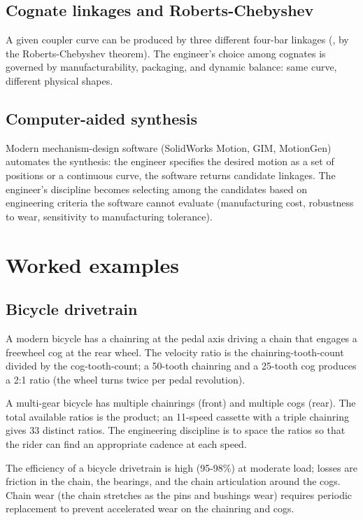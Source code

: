\subsection{Cognate linkages and Roberts-Chebyshev}

A given coupler curve can be produced by three different four-bar linkages (, by the Roberts-Chebyshev theorem). The engineer's choice among cognates is governed by manufacturability, packaging, and dynamic balance: same curve, different physical shapes.

\subsection{Computer-aided synthesis}

Modern mechanism-design software (SolidWorks Motion, GIM, MotionGen) automates the synthesis: the engineer specifies the desired motion as a set of positions or a continuous curve, the software returns candidate linkages. The engineer's discipline becomes selecting among the candidates based on engineering criteria the software cannot evaluate (manufacturing cost, robustness to wear, sensitivity to manufacturing tolerance).

\section{Worked examples}

\subsection{Bicycle drivetrain}

A modern bicycle has a chainring at the pedal axis driving a chain that engages a freewheel cog at the rear wheel. The velocity ratio is the chainring-tooth-count divided by the cog-tooth-count; a 50-tooth chainring and a 25-tooth cog produces a 2:1 ratio (the wheel turns twice per pedal revolution).

A multi-gear bicycle has multiple chainrings (front) and multiple cogs (rear). The total available ratios is the product; an 11-speed cassette with a triple chainring gives 33 distinct ratios. The engineering discipline is to space the ratios so that the rider can find an appropriate cadence at each speed.

The efficiency of a bicycle drivetrain is high (95-98\%) at moderate load; losses are friction in the chain, the bearings, and the chain articulation around the cogs. Chain wear (the chain stretches as the pins and bushings wear) requires periodic replacement to prevent accelerated wear on the chainring and cogs.

